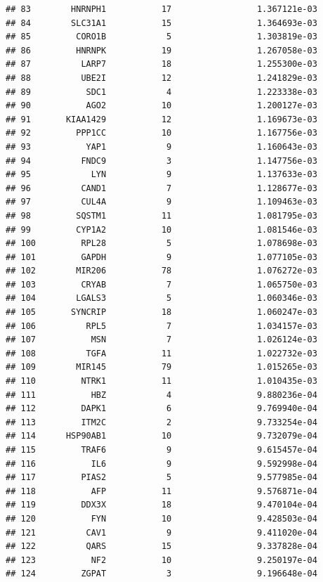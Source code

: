\documentclass[
]{article}
\begin{document}
\begin{verbatim}
## 83        HNRNPH1           17                 1.367121e-03
## 84        SLC31A1           15                 1.364693e-03
## 85         CORO1B            5                 1.303819e-03
## 86         HNRNPK           19                 1.267058e-03
## 87          LARP7           18                 1.255300e-03
## 88          UBE2I           12                 1.241829e-03
## 89           SDC1            4                 1.223338e-03
## 90           AGO2           10                 1.200127e-03
## 91       KIAA1429           12                 1.169673e-03
## 92         PPP1CC           10                 1.167756e-03
## 93           YAP1            9                 1.160643e-03
## 94          FNDC9            3                 1.147756e-03
## 95            LYN            9                 1.137633e-03
## 96          CAND1            7                 1.128677e-03
## 97          CUL4A            9                 1.109463e-03
## 98         SQSTM1           11                 1.081795e-03
## 99         CYP1A2           10                 1.081546e-03
## 100         RPL28            5                 1.078698e-03
## 101         GAPDH            9                 1.077105e-03
## 102        MIR206           78                 1.076272e-03
## 103         CRYAB            7                 1.065750e-03
## 104        LGALS3            5                 1.060346e-03
## 105       SYNCRIP           18                 1.060247e-03
## 106          RPL5            7                 1.034157e-03
## 107           MSN            7                 1.026124e-03
## 108          TGFA           11                 1.022732e-03
## 109        MIR145           79                 1.015265e-03
## 110         NTRK1           11                 1.010435e-03
## 111           HBZ            4                 9.880236e-04
## 112         DAPK1            6                 9.769940e-04
## 113         ITM2C            2                 9.733254e-04
## 114      HSP90AB1           10                 9.732079e-04
## 115         TRAF6            9                 9.615457e-04
## 116           IL6            9                 9.592998e-04
## 117         PIAS2            5                 9.577985e-04
## 118           AFP           11                 9.576871e-04
## 119         DDX3X           18                 9.470104e-04
## 120           FYN           10                 9.428503e-04
## 121          CAV1            9                 9.411020e-04
## 122          QARS           15                 9.337828e-04
## 123           NF2           10                 9.250197e-04
## 124         ZGPAT            3                 9.196648e-04

\end{verbatim}
\end{document}
